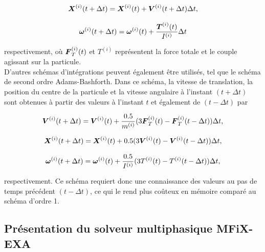 \begin{equation} \label{eq: 23}
\boldsymbol{X}^{(i)}(t+\Delta t) = \boldsymbol{X}^{(i)}(t) + \boldsymbol{V}^{(i)}(t+\Delta t) \Delta t,
\end{equation}

\begin{equation} \label{eq: 24}
\boldsymbol{\omega}^{(i)}(t+\Delta t) = \boldsymbol{\omega}^{(i)}(t) + \frac{\boldsymbol{T}^{(i)}(t)}{I^{(i)}}\Delta t
\end{equation}

\noindent respectivement, où $\boldsymbol{F}_T^{(i)}(t)$ et $T^{(i)}$ représentent la force totale et le couple agissant sur la particule.\\

D'autres schémas d'intégrations peuvent également être utilisés, tel que le schéma de second ordre Adams-Bashforth. Dans ce schéma, la vitesse de translation, la position du centre de la particule et la vitesse angulaire à l'instant $(t + \Delta t)$ sont obtenues à partir des valeurs à l'instant $t$ et également de $(t - \Delta t)$ par

\begin{equation} \label{eq: 25}
\boldsymbol{V}^{(i)}(t+\Delta t) = \boldsymbol{V}^{(i)}(t) + \frac{0.5}{m^{(i)}}(3 \boldsymbol{F}_T^{(i)}(t) - \boldsymbol{F}_T^{(i)}(t- \Delta t))\Delta t,
\end{equation}

\begin{equation} \label{eq: 26}
\boldsymbol{X}^{(i)}(t+\Delta t) = \boldsymbol{X}^{(i)}(t) + 0.5(3 \boldsymbol{V}^{(i)}(t) - \boldsymbol{V}^{(i)}(t- \Delta t))\Delta t,
\end{equation}

\begin{equation} \label{eq: 27}
\boldsymbol{\omega}^{(i)}(t+\Delta t) = \boldsymbol{\omega}^{(i)}(t) + \frac{0.5}{I^{(i)}}(3T^{(i)}(t) - T^{(i)}(t- \Delta t))\Delta t,
\end{equation}

\noindent respectivement. Ce schéma requiert donc une connaissance des valeurs au pas de temps précédent $(t- \Delta t)$, ce qui le rend plus coûteux en mémoire comparé au schéma d'ordre 1.

\subsection{Présentation du solveur multiphasique MFiX-EXA}

